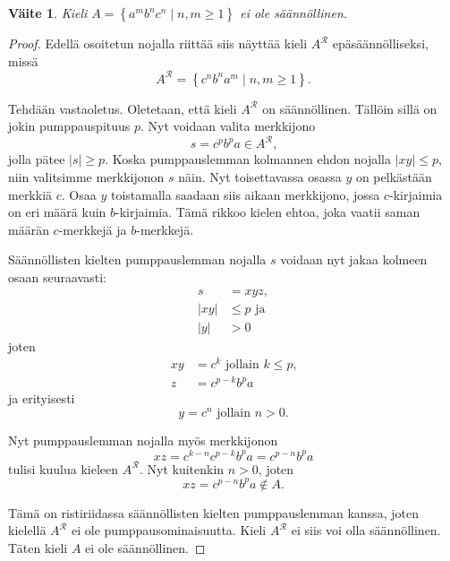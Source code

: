 \documentclass[a4paper,11pt]{article}
\newtheorem*{claim}{Väite}
\theoremstyle{definition}
\newcommand{\set}[1]{{\left\{ #1 \right\}}}
\begin{document}
\begin{claim}
    Kieli $A = \set{a^m b^n c^n \mid n,m\geq 1}$ ei ole säännöllinen.
\end{claim}

\begin{proof}

    Edellä osoitetun nojalla riittää siis näyttää kieli $A^\mathcal{R}$
    epäsäännölliseksi, missä
    \begin{equation*}
        A^\mathcal{R} = \set{c^nb^na^m \mid n,m \geq 1}.
    \end{equation*}

    Tehdään vastaoletus. Oletetaan, että kieli $A^\mathcal{R}$ on sään\-nöl\-li\-nen.
    Tällöin sillä on jokin pumppauspituus $p$. Nyt voidaan valita merkkijono
    \begin{equation*}
        s = c^pb^pa \in A^\mathcal{R} \textrm{,}
    \end{equation*}
    jolla pätee $|s| \geq p$. Koska pumppauslemman kolmannen ehdon nojalla
    $|xy| \leq p$, niin valitsimme merkkijonon $s$ näin. Nyt toisettavassa
    osassa $y$ on pelkästään merkkiä $c$. Osaa $y$ toistamalla saadaan siis
    aikaan merkkijono, jossa $c$-kirjaimia on eri määrä kuin $b$-kirjaimia.
    Tämä rikkoo kielen ehtoa, joka vaatii saman määrän $c$-merkkejä ja
    $b$-merkkejä.

    Säännöllisten kielten pumppauslemman nojalla $s$ voidaan nyt jakaa kolmeen
    osaan seuraavasti:
    \begin{align*}
        s    & = xyz, \\
        |xy| & \leq p \textrm{ ja}\\
        |y|  & > 0
    \end{align*}
    joten
    \begin{align*}
        xy & = c^k          \textrm{ jollain } k \leq p \text{,} \\
        z  & = c^{p-k}b^pa
    \end{align*}
    ja erityisesti
    \begin{equation*}
        y = c^n \text{ jollain } n > 0 \text{.}
    \end{equation*}

    Nyt pumppauslemman nojalla myös merkkijonon
    \begin{equation*}
        xz = c^{k-n}c^{p-k}b^pa = c^{p-n}b^pa
    \end{equation*}
    tulisi kuulua kieleen $A^\mathcal{R}$. Nyt kuitenkin $n > 0$, joten
    \begin{equation*}
        xz = c^{p-n}b^pa \notin A.
    \end{equation*}

    Tämä on ristiriidassa säännöllisten kielten pumppauslemman kanssa, joten
    kielellä $A^\mathcal{R}$ ei ole pumppausominaisuutta. Kieli $A^\mathcal{R}$
    ei siis voi olla säännöllinen. Täten kieli $A$ ei ole säännöllinen.
\end{proof}
\end{document}
